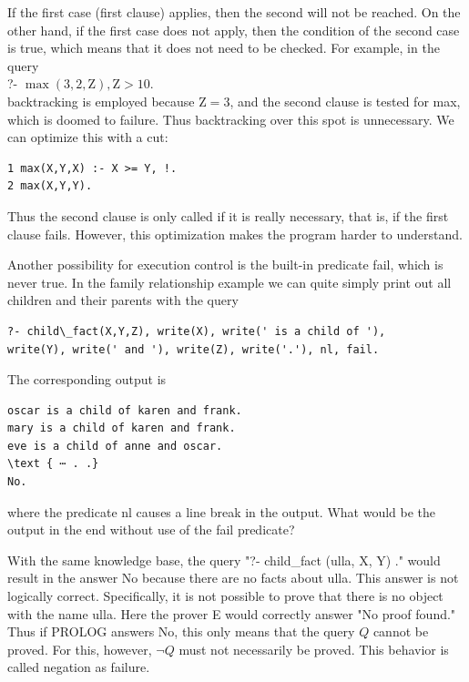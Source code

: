 \documentclass[10pt]{article}
\begin{document}
If the first case (first clause) applies, then the second will not be reached. On the other hand, if the first case does not apply, then the condition of the second case is true, which means that it does not need to be checked. For example, in the query\\
?- $\max (3,2, \mathrm{Z}), \mathrm{Z}>10$.\\
backtracking is employed because $\mathrm{Z}=3$, and the second clause is tested for max, which is doomed to failure. Thus backtracking over this spot is unnecessary. We can optimize this with a cut:

\begin{verbatim}
1 max(X,Y,X) :- X >= Y, !.
2 max(X,Y,Y).
\end{verbatim}

Thus the second clause is only called if it is really necessary, that is, if the first clause fails. However, this optimization makes the program harder to understand.

Another possibility for execution control is the built-in predicate fail, which is never true. In the family relationship example we can quite simply print out all children and their parents with the query

\begin{verbatim}
?- child\_fact(X,Y,Z), write(X), write(' is a child of '),
write(Y), write(' and '), write(Z), write('.'), nl, fail.
\end{verbatim}

The corresponding output is

\begin{verbatim}
oscar is a child of karen and frank.
mary is a child of karen and frank.
eve is a child of anne and oscar.
\text { ⋯ . .}
No.
\end{verbatim}

where the predicate nl causes a line break in the output. What would be the output in the end without use of the fail predicate?

With the same knowledge base, the query "?- child\_fact (ulla, X, Y) ." would result in the answer No because there are no facts about ulla. This answer is not logically correct. Specifically, it is not possible to prove that there is no object with the name ulla. Here the prover E would correctly answer "No proof found." Thus if PROLOG answers No, this only means that the query $Q$ cannot be proved. For this, however, $\neg Q$ must not necessarily be proved. This behavior is called negation as failure.
\end{document}
